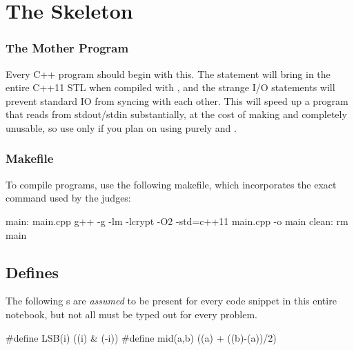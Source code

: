 \documentclass[../../main]{subfiles}
\begin{document}
\section{The Skeleton}
    \subsubsection*{The Mother Program}
        Every C++ program should begin with this.
        The  statement will bring in the entire C++11 STL when compiled with , and the strange I/O statements will prevent standard IO from syncing with each other. This will speed up a program that reads from stdout/stdin substantially, at the cost of making  and  completely unusable, so use only if you plan on using purely  and .
        

    \subsubsection*{Makefile}
    To compile programs, use the following makefile, which incorporates the exact command used by the judges:
    \begin{cpp}
    main: main.cpp
        g++ -g -lm -lcrypt -O2 -std=c++11 main.cpp -o main
    clean:
        rm main
    \end{cpp}

\subsection{Defines}
    The following s are \textit{assumed} to be present for every code snippet in this entire notebook, but not all must be typed out for every problem.
    \begin{cpp}
        #define LSB(i) ((i) & (-i))
        #define mid(a,b) ((a) + ((b)-(a))/2)
    \end{cpp}
\end{document}

